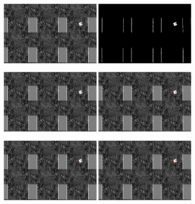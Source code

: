 \begin{figure}[!htbp]
  \centering
  {\includegraphics[width=0.45\textwidth]{img/18730previousImage.png}\label{fig:original}}
  \hfill
  {\includegraphics[width=0.45\textwidth]{img/18730_thresholded.png}\label{fig:threshold}}
  \vspace{1cm}
  
  {\includegraphics[width=0.45\textwidth]{img/18741_optical_flow.png}\label{fig:optical1}}
  \hfill
  {\includegraphics[width=0.45\textwidth]{img/18758_optical_flow.png}\label{fig:optical2}}
  \vspace{1cm}
  
  {\includegraphics[width=0.45\textwidth]{img/18777_optical_flow.png}\label{fig:optical3}}
  \hfill
  {\includegraphics[width=0.45\textwidth]{img/18800_optical_flow.png}\label{fig:optical4}}
   

\end{figure}
